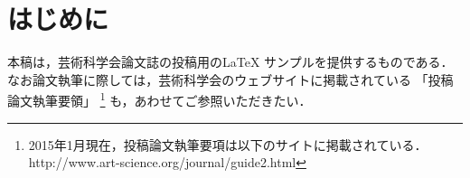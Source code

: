 \section{はじめに}

本稿は，芸術科学会論文誌の投稿用のLaTeX サンプルを提供するものである．
なお論文執筆に際しては，芸術科学会のウェブサイトに掲載されている
「投稿論文執筆要領」
\footnote{
2015年1月現在，投稿論文執筆要項は以下のサイトに掲載されている．\\
http://www.art-science.org/journal/guide2.html
}
も，あわせてご参照いただきたい．
